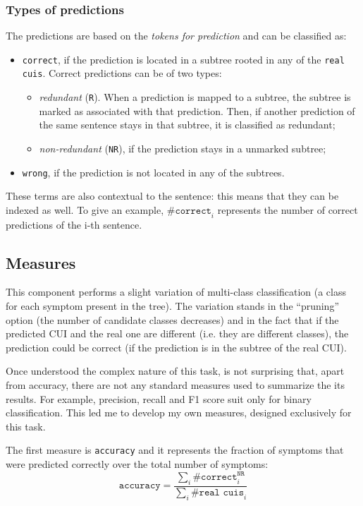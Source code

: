 \subsubsection{Types of predictions}
The predictions are based on the \textit{tokens for prediction} and can be classified as:
\begin{itemize}
  \item \texttt{correct}, if the prediction is located in a subtree rooted in any of the \texttt{real cuis}. Correct predictions can be of two types:
    \begin{itemize}
      \item \textit{redundant} (\texttt{R}). When a prediction is mapped to a subtree, the subtree is marked as associated with that prediction. Then, if another prediction of the same sentence stays in that subtree, it is classified as redundant;
      \item \textit{non-redundant} (\texttt{NR}), if the prediction stays in a unmarked subtree;
    \end{itemize}
  \item \texttt{wrong}, if the prediction is not located in any of the subtrees.
\end{itemize}

These terms are also contextual to the sentence: this means that they can be indexed as well. To give an example, $\texttt{\#correct}_{i}$ represents the number of correct predictions of the i-th sentence.

\subsection{Measures}
This component performs a slight variation of multi-class classification (a class for each symptom present in the tree). The variation stands in the ``pruning'' option (the number of candidate classes decreases) and in the fact that if the predicted CUI and the real one are different (i.e. they are different classes), the prediction could be correct (if the prediction is in the subtree of the real CUI).

Once understood the complex nature of this task, is not surprising that, apart from accuracy, there are not any standard measures used to summarize the its results. For example, precision, recall and F1 score suit only for binary classification. This led me to develop my own measures, designed exclusively for this task.

The first measure is \texttt{accuracy} and it represents the fraction of symptoms that were predicted correctly over the total number of symptoms:
\begin{equation}
\texttt{accuracy} = \frac{\sum_{i}{\texttt{\#correct}_{i}^{\texttt{NR}}}}{\sum_{i}{\texttt{\#real cuis}_{i}}}
\end{equation}

